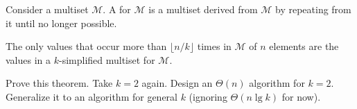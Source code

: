 \begin{frame}{}
  
  \begin{definition}
    Consider a multiset $\mathcal{M}$.
    A  for $\mathcal{M}$ is a multiset derived from $\mathcal{M}$
    by repeating  from it until no longer possible.

  \end{definition}

  \begin{theorem}

    The only values that  occur more than $\lfloor n / k \rfloor$ times in $\mathcal{M}$ of $n$ elements
    are the values in a $k$-simplified multiset for $\mathcal{M}$.
  \end{theorem}

  Prove this theorem. Take $k = 2$ again. Design an $\Theta(n)$ algorithm for $k = 2$. 
  Generalize it to an algorithm for general $k$ (ignoring $\Theta(n \lg k)$ for now).
\end{frame}



